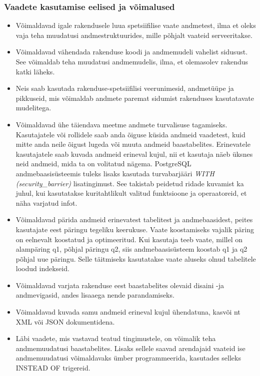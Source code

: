 \documentclass[a4paper,12pt]{article} %
\begin{document}
\subsubsection{Vaadete kasutamise eelised ja võimalused}
\begin{itemize}
\item Võimaldavad igale rakendusele luua spetsiifilise vaate andmetest, ilma et oleks vaja teha muudatusi andmestruktuurides, mille põhjalt vaateid serveeritakse.
\item Võimaldavad vähendada rakenduse koodi ja andmemudeli vahelist sidusust.
See võimaldab teha muudatusi andmemudelis, ilma, et olemasolev rakendus katki läheks.
\item Neis saab kasutada rakenduse-spetsiifilisi veerunimesid, andmetüüpe ja pikkuseid, mis võimaldab  andmete paremat sidumist rakenduses kasutatavate mudelitega.
\item Võimaldavad ühe täiendava meetme andmete turvalisuse tagamiseks. Kasutajatele või rollidele saab anda õiguse küsida andmeid vaadetest, kuid mitte anda neile õigust lugeda või muuta andmeid baastabelites. Erinevatele kasutajatele saab kuvada andmeid erineval kujul, nii et kasutaja näeb üksnes neid andmeid, mida ta on volitatud nägema. PostgreSQL andmebaasisüsteemis tuleks lisaks kasutada turvabarjääri \textit{WITH (security\_barrier)} lisatingimust. See takistab peidetud ridade kuvamist ka juhul, kui kasutatakse kuritahtlikult valitud funktsioone ja operaatoreid, et näha varjatud infot. \cite{PostgreSQLRulesAndPrivileges}
\item Võimaldavad pärida andmeid erinevatest tabelitest ja andmebaasidest, peites kasutajate eest päringu tegeliku keerukuse. Vaate koostamiseks vajalik päring on eelnevalt koostatud ja optimeeritud. Kui kasutaja teeb vaate, millel on alampäring q1, põhjal päringu q2, siis andmebaasisüsteem koostab q1 ja q2 põhjal uue päringu. Selle täitmiseks kasutatakse vaate aluseks olnud tabelitele loodud indekseid.
\item Võimaldavad varjata rakenduse eest baastabelites olevaid disaini -ja andmevigasid, andes lisaaega nende parandamiseks.
\item Võimaldavad kuvada samu andmeid erineval kujul ühendatuna, kasvõi nt XML või JSON dokumentidena.
\item Läbi vaadete, mis vastavad teatud tingimustele, on võimalik teha andmemuudatusi baastabelites. Lisaks sellele saavad arendajaid vaateid ise andmemuudatusi võimaldavaks ümber programmeerida, kasutades selleks INSTEAD OF trigereid.
\end{itemize}
\cite[lk 172-173]{BuildingTheAgileDatabase}
\end{document}
